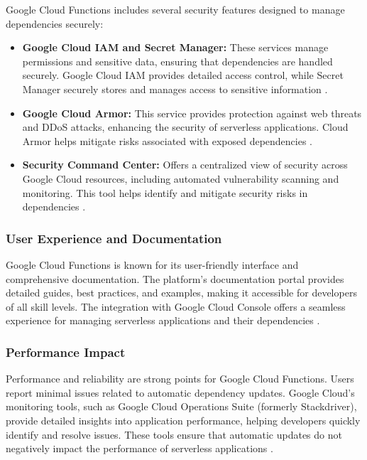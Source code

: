 \documentclass[sigconf]{acmart}
\begin{document}
Google Cloud Functions includes several security features designed to manage dependencies securely:

\begin{itemize}
    \item \textbf{Google Cloud IAM and Secret Manager:} These services manage permissions and sensitive data, ensuring that dependencies are handled securely. Google Cloud IAM provides detailed access control, while Secret Manager securely stores and manages access to sensitive information \cite{googleSecurity2023}.
    \item \textbf{Google Cloud Armor:} This service provides protection against web threats and DDoS attacks, enhancing the security of serverless applications. Cloud Armor helps mitigate risks associated with exposed dependencies \cite{googleArmor2023}.
    \item \textbf{Security Command Center:} Offers a centralized view of security across Google Cloud resources, including automated vulnerability scanning and monitoring. This tool helps identify and mitigate security risks in dependencies \cite{googleSCC2023}.
\end{itemize}

\subsubsection{User Experience and Documentation}

Google Cloud Functions is known for its user-friendly interface and comprehensive documentation. The platform's documentation portal provides detailed guides, best practices, and examples, making it accessible for developers of all skill levels. The integration with Google Cloud Console offers a seamless experience for managing serverless applications and their dependencies \cite{googleDocs2023}.

\subsubsection{Performance Impact}

Performance and reliability are strong points for Google Cloud Functions. Users report minimal issues related to automatic dependency updates. Google Cloud's monitoring tools, such as Google Cloud Operations Suite (formerly Stackdriver), provide detailed insights into application performance, helping developers quickly identify and resolve issues. These tools ensure that automatic updates do not negatively impact the performance of serverless applications \cite{googlePerformance2023}.
\end{document}
